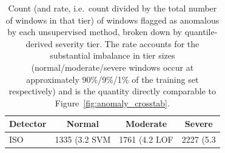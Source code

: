 \begin{table}[h]
\centering
\begin{tabular}{lccc}
\toprule
Detector & Normal & Moderate & Severe \\
\midrule
ISO & 1335 (3.2%
SVM & 1761 (4.2%
LOF & 2227 (5.3%
\bottomrule
\end{tabular}
\caption{Count (and rate, i.e.\ count divided by the total number of windows in that tier) of windows flagged as anomalous by each unsupervised method, broken down by quantile-derived severity tier. The rate accounts for the substantial imbalance in tier sizes (normal/moderate/severe windows occur at approximately 90\%/9\%/1\% of the training set respectively) and is the quantity directly comparable to Figure~\ref{fig:anomaly_crosstab}.}
\label{tab:anomaly_crosstab}
\end{table}
